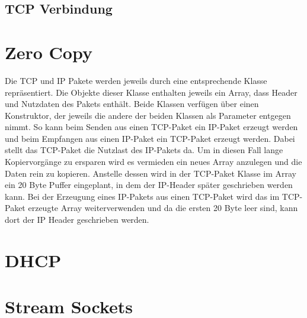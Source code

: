 \subsection{TCP Verbindung}






\section{Zero Copy}
Die TCP und IP Pakete werden jeweils durch eine entsprechende Klasse repräsentiert. Die Objekte dieser Klasse enthalten jeweils ein Array, dass Header und Nutzdaten des Pakets enthält. Beide Klassen verfügen über einen Konstruktor, der jeweils die andere der beiden Klassen als Parameter entgegen nimmt. So kann beim Senden aus einen TCP-Paket ein IP-Paket erzeugt werden und beim Empfangen aus einen IP-Paket ein TCP-Paket erzeugt werden. Dabei stellt das TCP-Paket die Nutzlast des IP-Pakets da. Um in diesen Fall lange Kopiervorgänge zu ersparen wird es vermieden ein neues Array anzulegen und die Daten rein zu kopieren. Anstelle dessen wird in der TCP-Paket Klasse im Array ein 20 Byte Puffer eingeplant, in dem der IP-Header später geschrieben werden kann. Bei der Erzeugung eines IP-Pakets aus einen TCP-Paket wird das im TCP-Paket erzeugte Array weiterverwenden und da die ersten 20 Byte leer sind, kann dort der IP Header geschrieben werden. 


\section{DHCP}

\section{Stream Sockets}

